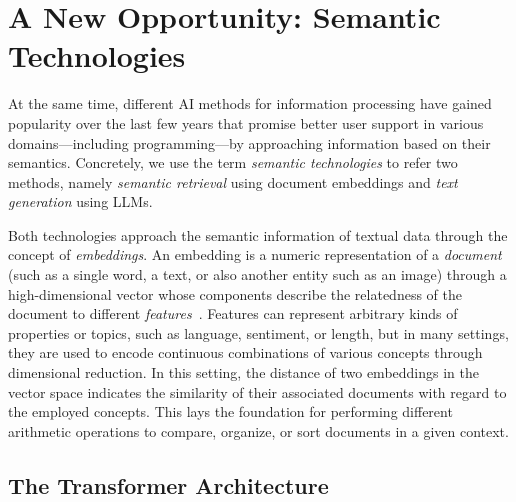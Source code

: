 
\section{A New Opportunity: Semantic Technologies}
\label{sec:background/semtec}

At the same time, different AI methods for information processing have gained popularity over the last few years that promise better user support in various domains---including programming---by approaching information based on their semantics.
Concretely, we use the term \emph{semantic technologies} to refer two methods, namely \emph{semantic retrieval} using document embeddings and \emph{text generation} using LLMs.

Both technologies approach the semantic information of textual data through the concept of \emph{embeddings}.
An embedding is a numeric representation of a \emph{document} (such as a single word, a text, or also another entity such as an image) through a high-dimensional vector whose components describe the relatedness of the document to different \emph{features}~\cite{mikolov2013efficient,devlin2019bert}.
Features can represent arbitrary kinds of properties or topics, such as language, sentiment, or length, but in many settings, they are used to encode continuous combinations of various concepts through dimensional reduction.
In this setting, the distance of two embeddings in the vector space indicates the similarity of their associated documents with regard to the employed concepts.
This lays the foundation for performing different arithmetic operations to compare, organize, or sort documents in a given context.

\subsection{The Transformer Architecture}

